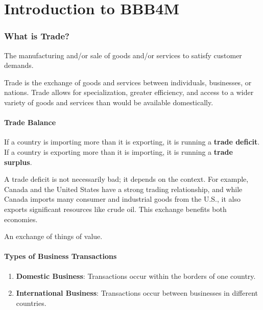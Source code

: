 
\part{Introduction to BBB4M}

\section{What is Trade?}%

\begin{definition}[Business]
   The manufacturing and/or sale of goods and/or services
   to satisfy customer demands.
\end{definition}

Trade is the exchange of goods and services between individuals, businesses, 
or nations. Trade allows for specialization, greater efficiency, and access 
to a wider variety of goods and services than would be available domestically.

\subsection{Trade Balance}
If a country is importing more than it is exporting, it is running a 
\textbf{trade deficit}. If a country is exporting more than it is importing, 
it is running a \textbf{trade surplus}.

A trade deficit is not necessarily bad; it depends on the context. 
For example, Canada and the United States have a strong trading relationship, 
and while Canada imports many consumer and industrial goods from the U.S., 
it also exports significant resources like crude oil. This exchange benefits both economies.

\begin{definition}[Transaction]
   An exchange of things of value.
\end{definition}

\subsection{Types of Business Transactions}
\begin{enumerate}
    \item \textbf{Domestic Business}: Transactions occur within the borders of one country.
    \item \textbf{International Business}: Transactions occur between businesses in different countries.
\end{enumerate}

